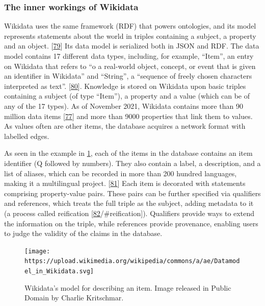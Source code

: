 \hypertarget{the-inner-workings-of-wikidata}{%
\subsubsection{The inner workings of Wikidata}\label{the-inner-workings-of-wikidata}}

Wikidata uses the same framework (RDF) that powers ontologies, and its model represents statements about the world in triples containing a subject, a property and an object. {[}\protect\hyperlink{ref-Ea6hVYrD}{79}{]}
Its data model is serialized both in JSON and RDF.
The data model contains 17 different data types, including, for example, ``Item'', an entry on Wikidata that refers to ``o a real-world object, concept, or event that is given an identifier in Wikidata'' and ``String'', a ``sequence of freely chosen characters interpreted as text''. {[}\protect\hyperlink{ref-17Yt10yrY}{80}{]}.
Knowledge is stored on Wikidata upon basic triples containing a subject (of type ``Item''), a property and a value (which can be of any of the 17 types).
As of November 2021, Wikidata contains more than 90 million data items {[}\protect\hyperlink{ref-SGzjBOG0}{77}{]} and more than 9000 properties that link them to values.
As values often are other items, the database acquires a network format with labelled edges.

As seen in the example in \ref{fig:douglas_adams}, each of the items in the database contains an item identifier (Q followed by numbers).
They also contain a label, a description, and a list of aliases, which can be recorded in more than 200 hundred languages, making it a multilingual project. {[}\protect\hyperlink{ref-S1Lksw7i}{81}{]}
Each item is decorated with statements comprising property-value pairs.
These pairs can be further specified via qualifiers and references, which treats the full triple as the subject, adding metadata to it (a process called reification {[}\protect\hyperlink{ref-ZhP1mKyl}{82}/\#reification{]}).
Qualifiers provide ways to extend the information on the triple, while references provide provenance, enabling users to judge the validity of the claims in the database.

\begin{figure}
\hypertarget{fig:douglas_adams}{%
\centering
\texttt{[image: https://upload.wikimedia.org/wikipedia/commons/a/ae/Datamodel\_in\_Wikidata.svg]}
\caption{Wikidata's model for describing an item. Image released in Public Domain by Charlie Kritschmar.}\label{fig:douglas_adams}
}
\end{figure}

